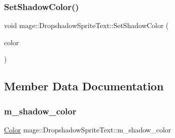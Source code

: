 \subsubsection{\texorpdfstring{Set\+Shadow\+Color()}{SetShadowColor()}\hspace{0.1cm}{\footnotesize\ttfamily [2/2]}}
{\footnotesize\ttfamily void mage\+::\+Dropshadow\+Sprite\+Text\+::\+Set\+Shadow\+Color (\begin{DoxyParamCaption}\item[{const X\+M\+V\+E\+C\+T\+OR \&}]{color }\end{DoxyParamCaption})}



\subsection{Member Data Documentation}
\hypertarget{classmage_1_1_dropshadow_sprite_text_a6343fd2b2b2139d8a869c29a2a33531f}{}\label{classmage_1_1_dropshadow_sprite_text_a6343fd2b2b2139d8a869c29a2a33531f} 
\subsubsection{\texorpdfstring{m\+\_\+shadow\+\_\+color}{m\_shadow\_color}}
{\footnotesize\ttfamily \hyperlink{structmage_1_1_color}{Color} mage\+::\+Dropshadow\+Sprite\+Text\+::m\+\_\+shadow\+\_\+color\hspace{0.3cm}{\ttfamily [private]}}

